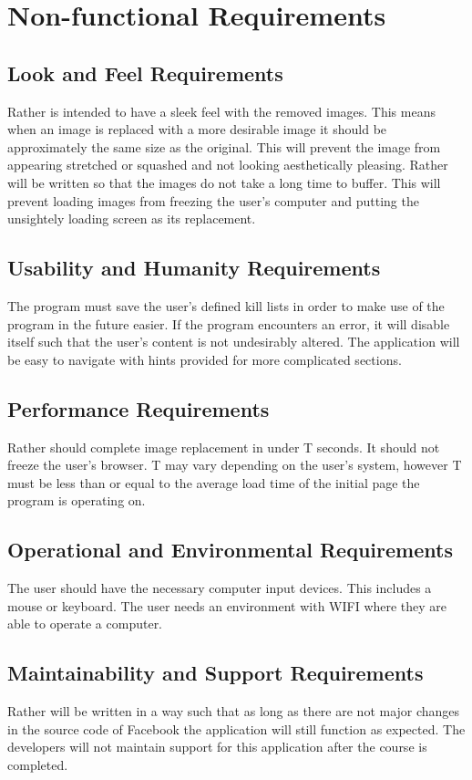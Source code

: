 \documentclass[12pt, titlepage]{article}
\begin{document}
\section{Non-functional Requirements}

\subsection{Look and Feel Requirements}
Rather is intended to have a sleek feel with the removed images. This means when an image is replaced with a more desirable image it should be approximately the same size as the original. This will prevent the image from appearing stretched or squashed and not looking aesthetically pleasing. Rather will be written so that the images do not take a long time to buffer. This will prevent loading images from freezing the user's computer and putting the unsightely loading screen as its replacement. 

\subsection{Usability and Humanity Requirements}
The program must save the user's defined kill lists in order to make use of the program in the future easier. If the program encounters an error, it will disable itself such that the user's content is not undesirably altered. The application will be easy to navigate with hints provided for more complicated sections.

\subsection{Performance Requirements}
Rather should complete image replacement in under T seconds. It should not freeze the user's browser. T may vary depending on the user's system, however T must be less than or equal to the average load time of the initial page the program is operating on.
\subsection{Operational and Environmental Requirements}
The user should have the necessary computer input devices. This includes a mouse or keyboard. The user needs an environment with WIFI where they are able to operate a computer.

\subsection{Maintainability and Support Requirements}
Rather will be written in a way such that as long as there are not major changes in the source code of Facebook the application will still function as expected. The developers will not maintain support for this application after the course is completed.
\end{document}
